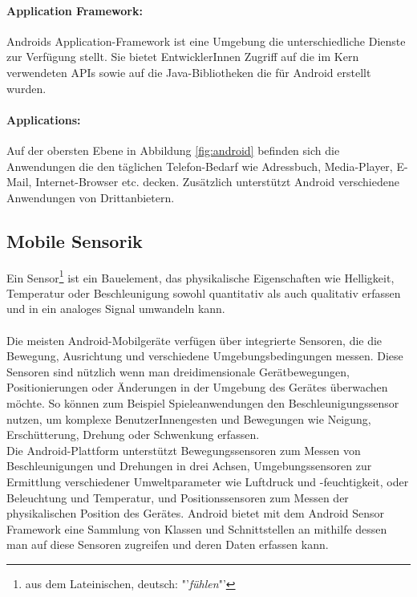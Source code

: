 \paragraph{Application Framework: }
Androids Application-Framework ist eine Umgebung die unterschiedliche Dienste zur Verfügung stellt. Sie bietet EntwicklerInnen Zugriff auf die im Kern verwendeten \glspl{API} sowie auf die Java-Bibliotheken die für Android erstellt wurden. 
\paragraph{Applications: }
Auf der obersten Ebene in Abbildung \ref{fig:android} befinden sich die Anwendungen die den täglichen Telefon-Bedarf wie Adressbuch, Media-Player, E-Mail, Internet-Browser etc. decken. Zusätzlich unterstützt Android verschiedene Anwendungen von Drittanbietern.
%
%
\subsection{Mobile Sensorik} 
Ein Sensor\footnote{ aus dem Lateinischen, deutsch: "'\textit{fühlen}"'} ist ein Bauelement, das physikalische Eigenschaften wie Helligkeit, Temperatur oder Beschleunigung sowohl quantitativ als auch qualitativ erfassen und in ein analoges Signal umwandeln kann. \cite{sensor} \\\\
Die meisten Android-Mobilgeräte verfügen über integrierte Sensoren, die die Bewegung, Ausrichtung und verschiedene Umgebungsbedingungen messen. Diese Sensoren sind nützlich wenn man dreidimensionale Gerätbewegungen, Positionierungen oder Änderungen in der Umgebung des Gerätes überwachen möchte. So können zum Beispiel Spieleanwendungen den Beschleunigungssensor nutzen, um komplexe BenutzerInnengesten und Bewegungen wie Neigung, Erschütterung, Drehung oder Schwenkung erfassen.\\
Die Android-Plattform unterstützt Bewegungssensoren zum Messen von Beschleunigungen und Drehungen in drei Achsen, Umgebungssensoren zur Ermittlung verschiedener Umweltparameter wie Luftdruck und -feuchtigkeit, oder Beleuchtung und Temperatur, und Positionssensoren zum Messen der physikalischen Position des Gerätes. Android bietet mit dem Android Sensor Framework eine Sammlung von Klassen und Schnittstellen an mithilfe dessen man auf diese Sensoren zugreifen und deren Daten erfassen kann. \cite{android_sensor}  
%
%
